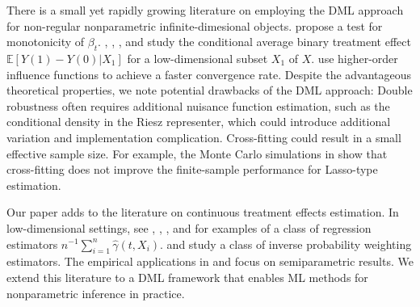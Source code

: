 \documentclass[lettersize, 12pt]{article}
\begin{document}

There is a small yet rapidly growing literature on employing the DML approach for non-regular nonparametric infinite-dimesional objects.
\cite{HHLL} propose a test for monotonicity of $\beta_t$.
\cite{CNS21EJ}, \cite{SC}, \cite{Fan}, and \cite{ZimmertLechner} study the conditional average binary treatment effect $\mathbb{E}[Y(1) - Y(0)|X_1]$ for a low-dimensional subset $X_1$ of $X$.
\cite{BonviniKennedy} use higher-order influence functions to achieve a faster convergence rate.
Despite the advantageous theoretical properties, we note potential drawbacks of the DML approach:
Double robustness often requires additional nuisance function estimation, such as the conditional density in the Riesz representer, which could introduce additional variation and implementation complication. 
Cross-fitting could result in a small effective sample size.
For example, the Monte Carlo simulations in \cite{Fan} show that cross-fitting does not improve the finite-sample performance for Lasso-type estimation.  

Our paper adds to the literature on continuous treatment effects estimation.
In low-dimensional settings, see \cite{Imbens00}, \cite{HI04}, \cite{Flores07}, and \cite{Lee} for examples of a class of regression estimators $n^{-1}\sum_{i=1}^n \hat \gamma(t, X_i)$.
\cite{GW} and \cite{HHLP} study a class of inverse probability weighting estimators.
The empirical applications in \cite{FFGN12ReStat} and \cite{KSUZ12} focus on semiparametric results.
We extend this literature to a DML framework that enables ML methods for nonparametric inference in practice.
\end{document}
